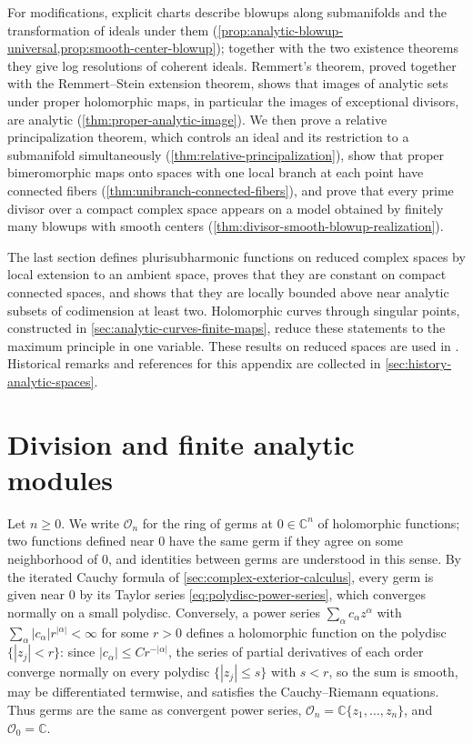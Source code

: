 For modifications, explicit charts describe blowups along submanifolds and the transformation of ideals under them (\cref{prop:analytic-blowup-universal,prop:smooth-center-blowup}); together with the two existence theorems they give log resolutions of coherent ideals. Remmert's theorem, proved together with the Remmert--Stein extension theorem, shows that images of analytic sets under proper holomorphic maps, in particular the images of exceptional divisors, are analytic (\cref{thm:proper-analytic-image}). We then prove a relative principalization theorem, which controls an ideal and its restriction to a submanifold simultaneously (\cref{thm:relative-principalization}), show that proper bimeromorphic maps onto spaces with one local branch at each point have connected fibers (\cref{thm:unibranch-connected-fibers}), and prove that every prime divisor over a compact complex space appears on a model obtained by finitely many blowups with smooth centers (\cref{thm:divisor-smooth-blowup-realization}).

The last section defines plurisubharmonic functions on reduced complex spaces by local extension to an ambient space, proves that they are constant on compact connected spaces, and shows that they are locally bounded above near analytic subsets of codimension at least two. Holomorphic curves through singular points, constructed in \cref{sec:analytic-curves-finite-maps}, reduce these statements to the maximum principle in one variable. These results on reduced spaces are used in \cite{XiaSampleBook}. Historical remarks and references for this appendix are collected in \cref{sec:history-analytic-spaces}.

\section{Division and finite analytic modules}
\label{sec:analytic-division}

Let $n\geq0$. We write $\mathcal O_n$ for the ring of germs at $0\in\mathbb C^n$ of holomorphic functions; two functions defined near $0$ have the same germ if they agree on some neighborhood of $0$, and identities between germs are understood in this sense. By the iterated Cauchy formula of \cref{sec:complex-exterior-calculus}, every germ is given near $0$ by its Taylor series \eqref{eq:polydisc-power-series}, which converges normally on a small polydisc. Conversely, a power series $\sum_\alpha c_\alpha z^\alpha$ with $\sum_\alpha|c_\alpha|r^{|\alpha|}<\infty$ for some $r>0$ defines a holomorphic function on the polydisc $\{|z_j|<r\}$: since $|c_\alpha|\leq Cr^{-|\alpha|}$, the series of partial derivatives of each order converge normally on every polydisc $\{|z_j|\leq s\}$ with $s<r$, so the sum is smooth, may be differentiated termwise, and satisfies the Cauchy--Riemann equations. Thus germs are the same as convergent power series, $\mathcal O_n=\mathbb C\{z_1,\ldots,z_n\}$, and $\mathcal O_0=\mathbb C$.

